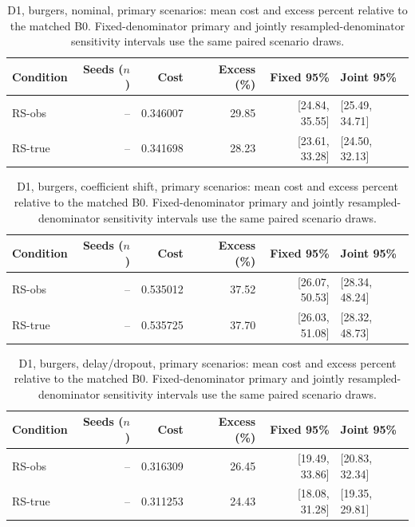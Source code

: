 \begin{table}[ht]
\centering\small
\caption{D1, burgers, nominal, primary scenarios: mean cost and excess percent relative to the matched B0. Fixed-denominator primary and jointly resampled-denominator sensitivity intervals use the same paired scenario draws.}\label{tab:revision_cost_E1_burgers_locked_nominal}
\begin{tabular}{@{}lrrrrl@{}}\toprule
Condition & Seeds ($n$) & Cost & Excess (\%) & Fixed 95\% & Joint 95\%\\\midrule
RS-obs & -- & 0.346007 & 29.85 & [24.84, 35.55] & [25.49, 34.71]\\
RS-true & -- & 0.341698 & 28.23 & [23.61, 33.28] & [24.50, 32.13]\\
\bottomrule\end{tabular}
\end{table}

\begin{table}[ht]
\centering\small
\caption{D1, burgers, coefficient shift, primary scenarios: mean cost and excess percent relative to the matched B0. Fixed-denominator primary and jointly resampled-denominator sensitivity intervals use the same paired scenario draws.}\label{tab:revision_cost_E1_burgers_locked_coefficient_ood}
\begin{tabular}{@{}lrrrrl@{}}\toprule
Condition & Seeds ($n$) & Cost & Excess (\%) & Fixed 95\% & Joint 95\%\\\midrule
RS-obs & -- & 0.535012 & 37.52 & [26.07, 50.53] & [28.34, 48.24]\\
RS-true & -- & 0.535725 & 37.70 & [26.03, 51.08] & [28.32, 48.73]\\
\bottomrule\end{tabular}
\end{table}

\begin{table}[ht]
\centering\small
\caption{D1, burgers, delay/dropout, primary scenarios: mean cost and excess percent relative to the matched B0. Fixed-denominator primary and jointly resampled-denominator sensitivity intervals use the same paired scenario draws.}\label{tab:revision_cost_E1_burgers_locked_delay_dropout}
\begin{tabular}{@{}lrrrrl@{}}\toprule
Condition & Seeds ($n$) & Cost & Excess (\%) & Fixed 95\% & Joint 95\%\\\midrule
RS-obs & -- & 0.316309 & 26.45 & [19.49, 33.86] & [20.83, 32.34]\\
RS-true & -- & 0.311253 & 24.43 & [18.08, 31.28] & [19.35, 29.81]\\
\bottomrule\end{tabular}
\end{table}

